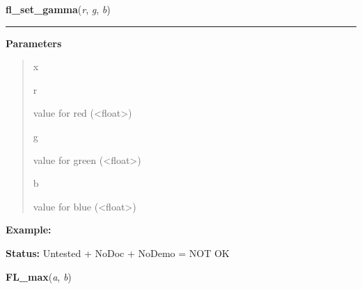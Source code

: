 \hspace{.8\funcindent}\begin{boxedminipage}{\funcwidth}

    \raggedright \textbf{fl\_set\_gamma}(\textit{r}, \textit{g}, \textit{b})

    \vspace{-1.5ex}

    \rule{\textwidth}{0.5\fboxrule}
\setlength{\parskip}{2ex}
\setlength{\parskip}{1ex}
      \textbf{Parameters}
      \vspace{-1ex}

      \begin{quote}
        \begin{Ventry}{x}

          \item[r]

          value for red ({\textless}float{\textgreater})

          \item[g]

          value for green ({\textless}float{\textgreater})

          \item[b]

          value for blue ({\textless}float{\textgreater})

        \end{Ventry}

      \end{quote}

\textbf{Example:} 

\textbf{Status:} Untested + NoDoc + NoDemo = NOT OK



    \end{boxedminipage}

    \label{xformslib:library:FL_max}

    \vspace{0.5ex}

\hspace{.8\funcindent}\begin{boxedminipage}{\funcwidth}

    \raggedright \textbf{FL\_max}(\textit{a}, \textit{b})

\setlength{\parskip}{2ex}
\setlength{\parskip}{1ex}
    \end{boxedminipage}

